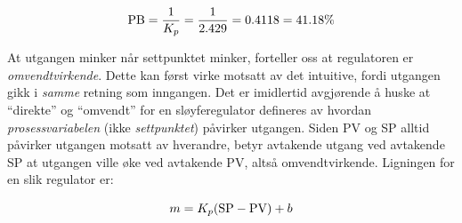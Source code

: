 $$\hbox{PB} = {1 \over K_p} = {1 \over 2.429} = 0.4118 = 41.18\%$$

\vskip 10pt

At utgangen minker når settpunktet minker, forteller oss at regulatoren er {\it omvendtvirkende}. Dette kan først virke motsatt av det intuitive, fordi utgangen gikk i {\it samme} retning som inngangen. Det er imidlertid avgjørende å huske at ``direkte'' og ``omvendt'' for en sløyferegulator defineres av hvordan {\it prosessvariabelen} (ikke {\it settpunktet}) påvirker utgangen. Siden PV og SP alltid påvirker utgangen motsatt av hverandre, betyr avtakende utgang ved avtakende SP at utgangen ville øke ved avtakende PV, altså omvendtvirkende. Ligningen for en slik regulator er:

$$m = K_p (\hbox{SP} - \hbox{PV}) + b$$



